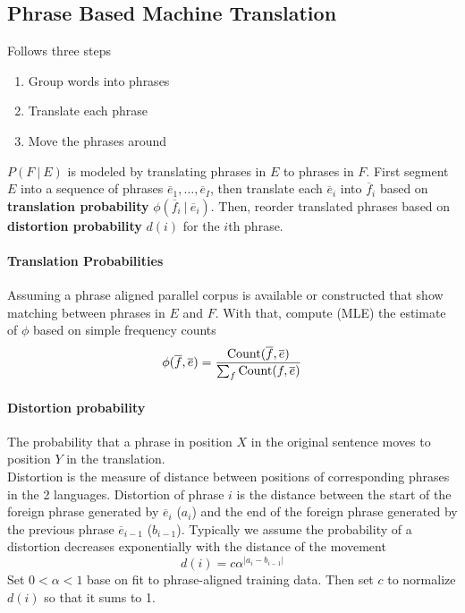 \documentclass[10pt]{report}
\begin{document}
\subsection{Phrase Based Machine Translation}
Follows three steps
\begin{enumerate}
	\item Group words into phrases
	\item Translate each phrase
	\item Move the phrases around
\end{enumerate}
$P(F\:|\:E)$ is modeled by translating phrases in $E$ to phrases in $F$. First segment $E$ into a sequence of phrases $\overline{e}_1,\ldots,\overline{e}_I$, then translate each $\overline{e}_i$ into $\overline{f}_i$ based on \textbf{translation probability} $\phi(\overline{f}_i\:|\:\overline{e}_i)$. Then, reorder translated phrases based on \textbf{distortion probability} $d(i)$ for the $i$th phrase.
\paragraph{Translation Probabilities} Assuming a phrase aligned parallel corpus is available or constructed that show matching between phrases in $E$ and $F$. With that, compute (MLE) the estimate of $\phi$ based on simple frequency counts $$\phi(\overline{f},\overline{e})=\frac{\hbox{Count}(\overline{f},\overline{e})}{\sum_{f} \hbox{Count}(f,\overline{e})}$$
\paragraph{Distortion probability} The probability that a phrase in position $X$ in the original sentence moves to position $Y$ in the translation.\\
Distortion is the measure of distance between positions of corresponding phrases in the 2 languages. Distortion of phrase $i$ is the distance between the start of the foreign phrase generated by $\overline{e}_i$ ($a_i$) and the end of the foreign phrase generated by the previous phrase $\overline{e}_{i-1}$ ($b_{i-1}$). Typically we assume the probability of a distortion decreases exponentially with the distance of the movement $$d(i) = c\alpha^{|a_i-b_{i-1}|}$$
Set $0<\alpha<1$ base on fit to phrase-aligned training data. Then set $c$ to normalize $d(i)$ so that it sums to 1.
\end{document}
